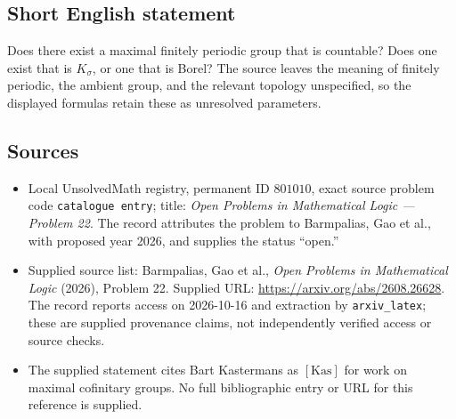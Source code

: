 \documentclass[11pt]{article}
\begin{document}
\subsection{Short English statement}
Does there exist a maximal finitely periodic group that is countable? Does one exist that is \(K_\sigma\), or one that is Borel? The source leaves the meaning of finitely periodic, the ambient group, and the relevant topology unspecified, so the displayed formulas retain these as unresolved parameters.
\subsection{Sources}
\begin{itemize}
\item Local UnsolvedMath registry, permanent ID \(801010\), exact source problem code \texttt{catalogue entry}; title: \emph{Open Problems in Mathematical Logic --- Problem 22}. The record attributes the problem to Barmpalias, Gao et al., with proposed year 2026, and supplies the status ``open.''
\item Supplied source list: Barmpalias, Gao et al., \emph{Open Problems in Mathematical Logic} (2026), Problem 22. Supplied URL: \url{https://arxiv.org/abs/2608.26628}. The record reports access on 2026-10-16 and extraction by \texttt{arxiv\_latex}; these are supplied provenance claims, not independently verified access or source checks.
\item The supplied statement cites Bart Kastermans as \([\mathrm{Kas}]\) for work on maximal cofinitary groups. No full bibliographic entry or URL for this reference is supplied.
\end{itemize}
\end{document}
